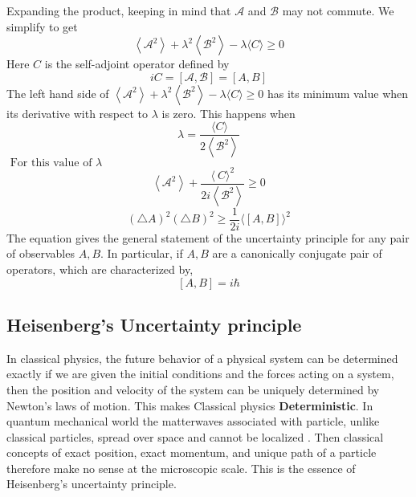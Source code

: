  Expanding the product, keeping in mind that $\mathcal{A}$ and $\mathcal{B}$ may not commute. We simplify to get\\
 $$\left\langle\mathcal{A}^{2}\right\rangle+\lambda^{2}\left\langle\mathcal{B}^{2}\right\rangle-\lambda\langle C \rangle \geqslant 0$$
 Here $C$ is the self-adjoint operator defined by
 $$
 i C=[\mathcal{A}, \mathcal{B}]=[A, B]
 $$
 The left hand side of $\left\langle\mathcal{A}^{2}\right\rangle+\lambda^{2}\left\langle\mathcal{B}^{2}\right\rangle-\lambda\langle C \rangle \geqslant 0$ has its minimum value when its derivative with respect to $\lambda$ is zero. This happens when
 $$
 \lambda=\frac{\langle C\rangle}{2\left\langle\mathcal{B}^{2}\right\rangle}
 $$
 $\text { For this value of } \lambda$\\
 $$\left\langle\mathcal{A}^{2}\right\rangle+\frac{\langle\ C \rangle^{2}}{2i																																																																								\left\langle\mathcal{B}^{2}\right\rangle} \geqslant 0$$
 $$(\triangle A)^{2}(\triangle B)^{2} \geqslant\frac{1}{2i}\langle[A, B]\rangle^{2}$$
The equation gives the general statement of the uncertainty principle for any pair of observables $A, B$. In particular, if $A, B$ are a canonically conjugate pair of operators, which are characterized by,
$$
[A, B]=i \hbar
$$
\subsection{Heisenberg's Uncertainty principle}
In classical physics, the future behavior  of a physical system can be determined exactly if we are given the  initial conditions and the forces acting on a system, then the position and velocity of the system can be uniquely determined by Newton's laws of motion. This makes Classical physics \textbf{Deterministic}. In quantum mechanical world the matterwaves associated with particle, unlike classical particles, spread over space and cannot be localized . Then classical concepts of exact position,
exact momentum, and unique path of a particle therefore make no sense at the microscopic
scale. This is the essence of Heisenberg’s uncertainty principle.

